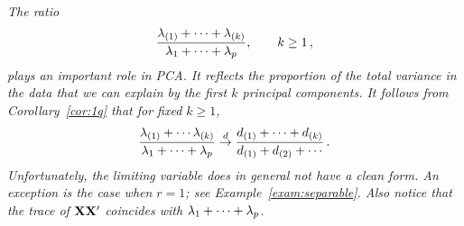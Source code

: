 \begin{remark}\label{rem:4.5}\em
The ratio
\begin{equation*}
\dfrac{\lambda_{(1)}+\cdots +\lambda_{(k)}}{\lambda_1+\cdots+\lambda_p}, \qquad k\ge 1\,,
\end{equation*}
plays an important role in PCA. It reflects the proportion of the total variance in the data that we can explain by the first $k$ principal components.
It follows from Corollary~\ref{cor:1q} that for fixed $k\ge 1$,
\begin{equation*}
\dfrac{\lambda_{(1)}+\cdots \lambda_{(k)}}{\lambda_1+\cdots+\lambda_p}\stackrel{d}{\rightarrow}
\dfrac{d_{(1)}+\cdots +d_{(k)}} {d_{(1)}+d_{(2)}+\cdots}\,.
\end{equation*}
Unfortunately, the limiting variable does in general not have a clean
form.
An exception is the case when $r=1$; see Example~\ref{exam:separable}.
Also notice that the trace of ${\mathbf X}{\mathbf X}'$ coincides with $\lambda_1+\cdots+\lambda_p$.
\end{remark}




